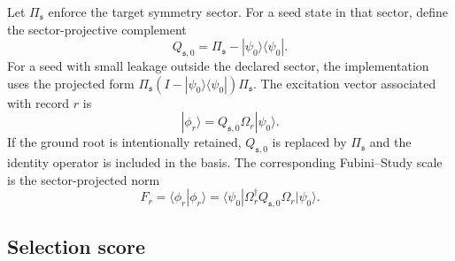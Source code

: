 \documentclass[
  reprint,
  amsmath,
  amssymb,
  aps,
  pra,
  nofootinbib,
  superscriptaddress,
  floatfix
]{revtex4-2}
\newcommand{\ket}[1]{|#1\rangle}
\newcommand{\bra}[1]{\langle #1|}
\newcommand{\braket}[2]{\langle #1|#2\rangle}
\begin{document}
Let \(\Pi_{\mathfrak s}\) enforce the target symmetry sector.  For a seed state in that sector, define the sector-projective complement
\begin{equation}
Q_{\mathfrak s,0}
=
\Pi_{\mathfrak s}-\ket{\psi_0}\bra{\psi_0}.
\label{eq:q0}
\end{equation}
For a seed with small leakage outside the declared sector, the implementation uses the projected form \(\Pi_{\mathfrak s}(I-\ket{\psi_0}\bra{\psi_0})\Pi_{\mathfrak s}\).  The excitation vector associated with record \(r\) is
\begin{equation}
\ket{\phi_r}
=
Q_{\mathfrak s,0}\Omega_r\ket{\psi_0}.
\label{eq:qse_basis_state}
\end{equation}
If the ground root is intentionally retained, \(Q_{\mathfrak s,0}\) is replaced by \(\Pi_{\mathfrak s}\) and the identity operator is included in the basis.  The corresponding Fubini--Study scale is the sector-projected norm
\begin{equation}
F_r
=
\braket{\phi_r}{\phi_r}
=
\bra{\psi_0}\Omega_r^\dagger Q_{\mathfrak s,0}\Omega_r\ket{\psi_0}.
\label{eq:qse_record_fs_norm}
\end{equation}

\subsection{Selection score}
\end{document}
